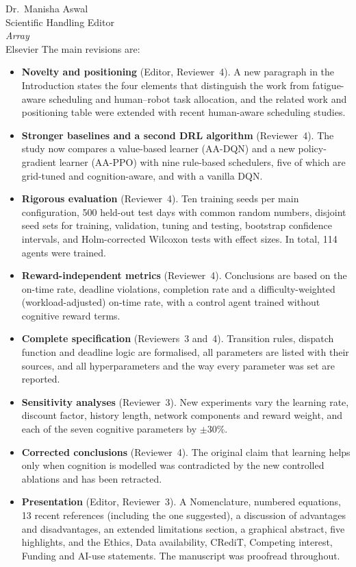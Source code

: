\documentclass[11pt]{letter}
\begin{document}
\begin{letter}{Dr.\ Manisha Aswal\\Scientific Handling Editor\\\textit{Array}\\Elsevier}
The main revisions are:
\begin{itemize}
\item \textbf{Novelty and positioning} (Editor, Reviewer~4). A new paragraph in the Introduction states the four elements that distinguish the work from fatigue-aware scheduling and human--robot task allocation, and the related work and positioning table were extended with recent human-aware scheduling studies.
\item \textbf{Stronger baselines and a second DRL algorithm} (Reviewer~4). The study now compares a value-based learner (AA-DQN) and a new policy-gradient learner (AA-PPO) with nine rule-based schedulers, five of which are grid-tuned and cognition-aware, and with a vanilla DQN.
\item \textbf{Rigorous evaluation} (Reviewer~4). Ten training seeds per main configuration, 500 held-out test days with common random numbers, disjoint seed sets for training, validation, tuning and testing, bootstrap confidence intervals, and Holm-corrected Wilcoxon tests with effect sizes. In total, 114 agents were trained.
\item \textbf{Reward-independent metrics} (Reviewer~4). Conclusions are based on the on-time rate, deadline violations, completion rate and a difficulty-weighted (workload-adjusted) on-time rate, with a control agent trained without cognitive reward terms.
\item \textbf{Complete specification} (Reviewers~3 and~4). Transition rules, dispatch function and deadline logic are formalised, all parameters are listed with their sources, and all hyperparameters and the way every parameter was set are reported.
\item \textbf{Sensitivity analyses} (Reviewer~3). New experiments vary the learning rate, discount factor, history length, network components and reward weight, and each of the seven cognitive parameters by $\pm30\%$.
\item \textbf{Corrected conclusions} (Reviewer~4). The original claim that learning helps only when cognition is modelled was contradicted by the new controlled ablations and has been retracted.
\item \textbf{Presentation} (Editor, Reviewer~3). A Nomenclature, numbered equations, 13 recent references (including the one suggested), a discussion of advantages and disadvantages, an extended limitations section, a graphical abstract, five highlights, and the Ethics, Data availability, CRediT, Competing interest, Funding and AI-use statements. The manuscript was proofread throughout.
\end{itemize}


\end{letter}
\end{document}
